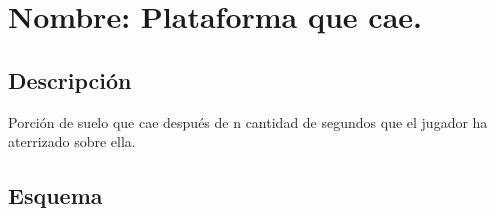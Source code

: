 \section{Nombre: Plataforma que cae.}\label{obs.plataformaD}
	\subsection{Descripción}
	Porción de suelo que cae después de n cantidad de segundos que el jugador ha aterrizado sobre ella.
	\subsection{Esquema}
